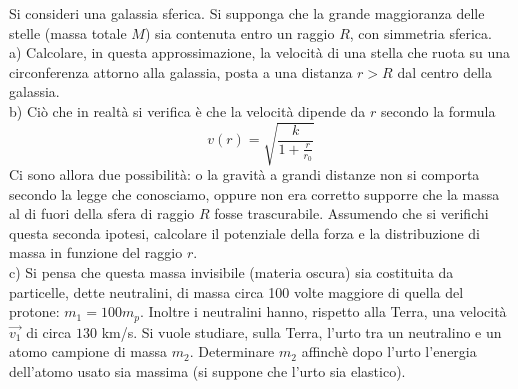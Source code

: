 \documentclass[../main.tex]{subfiles}
\begin{document}

\textex
Si consideri una galassia sferica. Si supponga che la grande maggioranza delle stelle (massa totale $M$) sia contenuta entro un raggio $R$, con simmetria sferica.\\
a) Calcolare, in questa approssimazione, la velocità di una stella che ruota su una circonferenza attorno alla galassia, posta a una distanza $r > R$ dal centro della galassia.\\
b) Ciò che in realtà si verifica è che la velocità dipende da $r$ secondo la formula
$$ v(r) = \sqrt{\frac{k}{1+\frac{r}{r_0}}}$$
Ci sono allora due possibilità: o la gravità a grandi distanze non si comporta secondo la legge che conosciamo, oppure non era corretto supporre che la massa al di fuori della sfera di raggio $R$ fosse trascurabile.
Assumendo che si verifichi questa seconda ipotesi, calcolare il potenziale della forza e la distribuzione di massa in funzione del raggio $r$.\\
c) Si pensa che questa massa invisibile (materia oscura) sia costituita da particelle, dette neutralini, di massa circa 100 volte maggiore di quella del protone: $m_1 = 100 m_p$.
Inoltre i neutralini hanno, rispetto alla Terra, una velocità $\overrightarrow{v_1}$ di circa $130$ km/s.
Si vuole studiare, sulla Terra, l'urto tra un neutralino e un atomo campione di massa $m_2$. Determinare $m_2$ affinchè dopo l'urto l'energia dell'atomo usato sia massima (si suppone che l'urto sia elastico).
\end{document}
